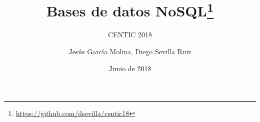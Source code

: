\documentclass[14pt]{beamer}
\title{Bases de datos
  NoSQL\thanks{\url{https://github.com/dsevilla/centic18}}}
\subtitle{CENTIC 2018}
\author{Jesús García Molina, Diego Sevilla Ruiz}
\institute[UMU]
{
Facultad de Informática\\
Universidad de Murcia\\
\medskip
\href{mailto:dsevilla@um.es}{\texttt{\{jmolina,dsevilla\}@um.es}}
}
\date{Junio de 2018}
\begin{document}









\begin{frame}
\titlepage %
\end{frame}





\end{document}
